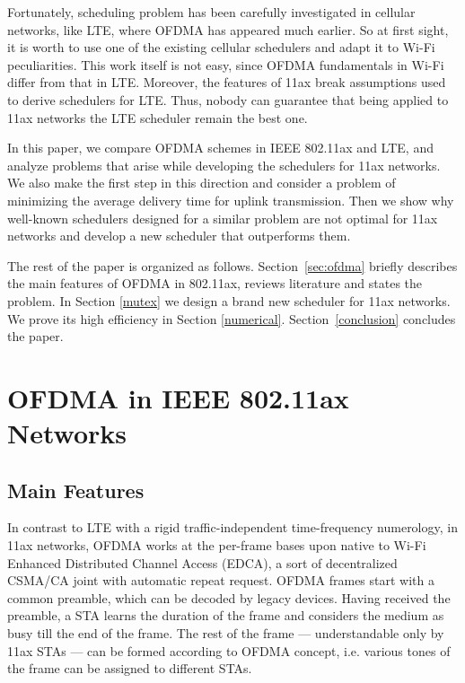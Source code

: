 Fortunately, scheduling problem has been carefully investigated in cellular networks, like LTE, where OFDMA has appeared much earlier. So at first sight, it is worth to use one of the existing cellular schedulers and adapt it to Wi-Fi peculiarities. This work itself is not easy, since OFDMA fundamentals in Wi-Fi differ from that in LTE. Moreover, the features of 11ax break assumptions used to derive schedulers for LTE. Thus, nobody can guarantee that being applied to 11ax networks the LTE scheduler remain the best one. 

In this paper, we compare OFDMA schemes in IEEE 802.11ax and LTE, and analyze problems that arise while developing the schedulers for 11ax networks. We also make the first step in this direction and consider a problem of minimizing the average delivery time for uplink transmission. Then we show why well-known schedulers designed for a similar problem are not optimal for 11ax networks and develop a new scheduler that outperforms them. 

The rest of the paper is organized as follows.
Section~\ref{sec:ofdma} briefly describes the main features of OFDMA in 802.11ax, reviews literature and states the problem.
In Section \ref{mutex} we design a brand new scheduler for 11ax networks.
We prove its high efficiency in Section \ref{numerical}.
Section~\ref{conclusion} concludes the paper. 



\section{OFDMA in IEEE 802.11ax Networks}
\subsection{Main Features}




In contrast to LTE with a rigid traffic-independent time-frequency numerology, in 11ax networks, OFDMA works at the per-frame bases upon native to Wi-Fi Enhanced Distributed Channel Access (EDCA), a sort of decentralized CSMA/CA joint with automatic repeat request. OFDMA frames start with a common preamble, which can be decoded by legacy devices. Having received the preamble, a STA learns the duration of the frame and considers the medium as busy till the end of the frame.
The rest of the frame --- understandable only by 11ax STAs --- can be formed according to OFDMA concept, i.e. various tones of the frame can be assigned to different STAs. 

